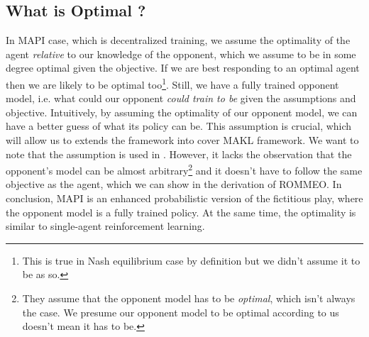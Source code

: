 \subsection{What is Optimal ?}
In MAPI case, which is decentralized training, we assume the optimality of the agent \textit{relative} to our knowledge of the opponent, which we assume to be in some degree optimal given the objective. If we are best responding to an optimal agent then we are likely to be optimal too\footnote{This is true in Nash equilibrium case by definition but we didn't assume it to be as so.}. Still, we have a fully trained opponent model, i.e. what could our opponent \textit{could train to be} given the assumptions and objective. Intuitively, by assuming the optimality of our opponent model, we can have a better guess of what its policy can be. This assumption is crucial, which will allow us to extends the framework into cover MAKL framework. We want to note that the assumption is used in \cite{tian2019regularized}. However, it lacks the observation that the opponent's model can be almost arbitrary\footnote{They assume that the opponent model has to be \textit{optimal}, which isn't always the case. We presume our opponent model to be optimal according to us doesn't mean it has to be.} and it doesn't have to follow the same objective as the agent, which we can show in the derivation of ROMMEO. In conclusion, MAPI is an enhanced probabilistic version of the fictitious play, where the opponent model is a fully trained policy. At the same time, the optimality is similar to single-agent reinforcement learning. 



